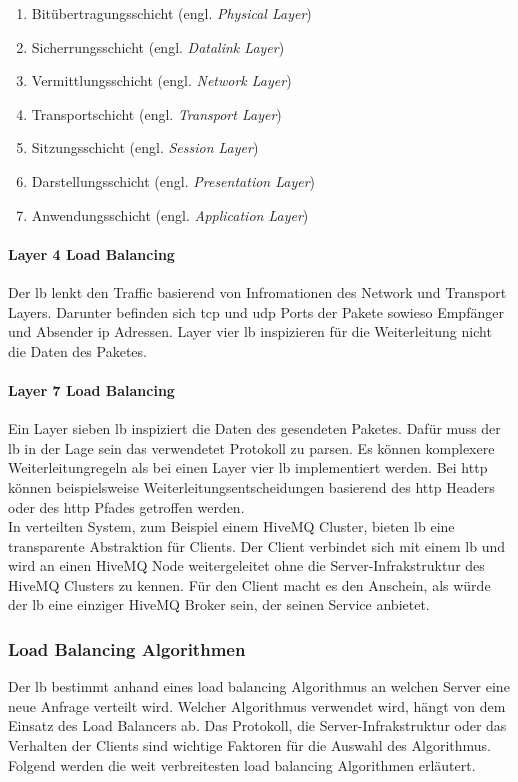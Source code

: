 \begin{enumerate}
    \item Bitübertragungsschicht (engl. \textit{Physical Layer})
    \item Sicherrungsschicht (engl. \textit{Datalink Layer})
    \item Vermittlungsschicht (engl. \textit{Network Layer})
    \item Transportschicht (engl. \textit{Transport Layer})
    \item Sitzungsschicht (engl. \textit{Session Layer})
    \item Darstellungsschicht (engl. \textit{Presentation Layer})
    \item Anwendungsschicht (engl. \textit{Application Layer})
\end{enumerate}
\paragraph{Layer 4 Load Balancing}
Der \ac{lb} lenkt den Traffic basierend von Infromationen des Network und Transport Layers. Darunter befinden sich \ac{tcp} und \ac{udp} Ports der Pakete sowieso Empfänger und Absender \ac{ip} Adressen. Layer vier \ac{lb} inspizieren für die Weiterleitung nicht die Daten des Paketes.
\cite{WhatLoadBalancer}

\paragraph{Layer 7 Load Balancing}
Ein Layer sieben \ac{lb} inspiziert die Daten des gesendeten Paketes. Dafür muss der \ac{lb} in der Lage sein das verwendetet Protokoll zu parsen. Es können komplexere Weiterleitungregeln als bei einen Layer vier \ac{lb} implementiert werden. Bei \ac{http} können beispielsweise Weiterleitungsentscheidungen basierend des \ac{http} Headers oder des \ac{http} Pfades getroffen werden.
\cite{WhatLoadBalancer}
\\
In verteilten System, zum Beispiel einem HiveMQ Cluster, bieten \acl{lb} eine transparente Abstraktion für Clients. Der Client verbindet sich mit einem \ac{lb} und wird an einen HiveMQ Node weitergeleitet ohne die Server-Infrakstruktur des HiveMQ Clusters zu kennen. Für den Client macht es den Anschein, als würde der \ac{lb} eine einziger HiveMQ Broker sein, der seinen Service anbietet.

\subsubsection{Load Balancing Algorithmen} \label{sb:lb-algo}
Der \acl{lb} bestimmt anhand eines load balancing Algorithmus an welchen Server eine neue Anfrage verteilt wird.
Welcher Algorithmus verwendet wird, hängt von dem Einsatz des Load Balancers ab.
Das Protokoll, die Server-Infrakstruktur oder das Verhalten der Clients sind wichtige Faktoren für die Auswahl des Algorithmus.
\\
Folgend werden die weit verbreitesten load balancing Algorithmen erläutert.


